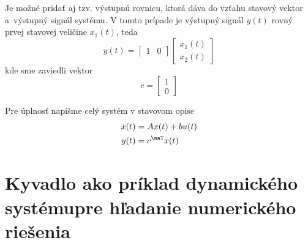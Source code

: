 \documentclass[a4paper, 10pt, ]{article}
\begin{document}
Je možné pridať aj tzv. výstupnú rovnicu, ktorá dáva do vzťahu stavový vektor a~výstupný signál systému. V tomto prípade je výstupný signál $y(t)$ rovný prvej stavovej veličine $x_1(t)$, teda
\begin{equation}
    y(t) = \begin{bmatrix} 1 & 0 \end{bmatrix} \begin{bmatrix} x_1(t) \\ x_2(t) \end{bmatrix}
\end{equation}
kde sme zaviedli vektor 
\begin{equation}
    c = \begin{bmatrix} 1 \\ 0 \end{bmatrix}
\end{equation}

Pre úplnosť napíšme celý systém v stavovom opise
\begin{subequations} \label{stavovyPriestorPrikladCely}
\begin{align}
    \dot x(t) &= Ax(t) + bu(t)   \\
    y(t) &= c^\naT  x(t)
\end{align}
\end{subequations}









\section{Kyvadlo ako príklad dynamického systému\newline pre hľadanie numerického riešenia}
\end{document}
